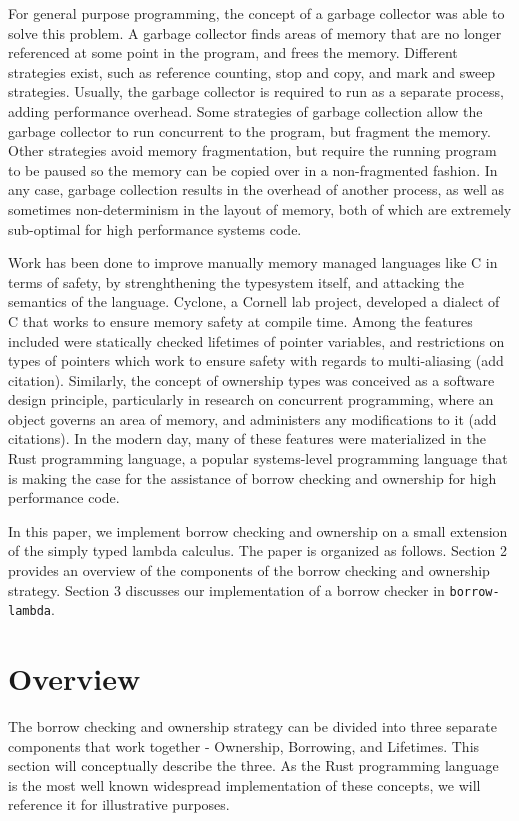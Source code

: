 \documentclass[letterpaper,11pt]{article}
\begin{document}
For general purpose programming, the concept of a garbage collector was able to solve
this problem. A garbage collector finds areas of memory that are no longer referenced
at some point in the program, and frees the memory. Different strategies exist, such
as reference counting, stop and copy, and mark and sweep strategies. Usually, the
garbage collector is required to run as a separate process, adding performance
overhead. Some strategies of garbage collection allow the garbage collector to run
concurrent to the program, but fragment the memory. Other strategies avoid memory
fragmentation, but require the running program to be paused so the memory can be
copied over in a non-fragmented fashion. In any case, garbage collection results
in the overhead of another process, as well as sometimes non-determinism in the layout
of memory, both of which are extremely sub-optimal for high performance systems code.

Work has been done to improve manually memory managed languages like C in terms of
safety, by strenghthening the typesystem itself, and attacking the semantics of the
language. Cyclone, a Cornell lab project, developed a dialect of C that works to
ensure memory safety at compile time. Among the features included were statically
checked lifetimes of pointer variables, and restrictions on types of pointers which
work to ensure safety with regards to multi-aliasing (add citation). Similarly, the
concept of ownership types was conceived as a software design principle, particularly
in research on concurrent programming, where an object governs an area of memory,
and administers any modifications to it (add citations). In the modern day,
many of these features were materialized in the Rust programming language, a popular
systems-level programming language that is making the case for the assistance of
borrow checking and ownership for high performance code.

In this paper, we implement borrow checking and ownership on a small extension of the
simply typed lambda calculus. The paper is organized as follows. Section 2 provides an
overview of the components of the borrow checking and ownership strategy. Section 3
discusses our implementation of a borrow checker in \texttt{borrow-lambda}.

\section{Overview}
The borrow checking and ownership strategy can be divided into three separate components
that work together - Ownership, Borrowing, and Lifetimes. This section will conceptually
describe the three. As the Rust programming language is the most well known widespread
implementation of these concepts, we will reference it for illustrative purposes.
\end{document}
